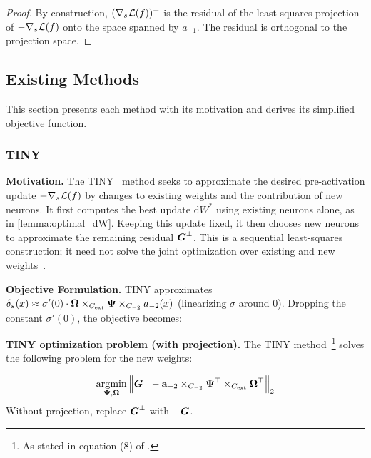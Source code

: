 \begin{proof}

By construction, \(\left( {\nabla_{s_{}}\mathcal{L}(f)} \right)^{\bot}\) is
the residual of the least-squares projection of
\(- {\nabla_{s_{}}\mathcal{L}(f)}\) onto the space spanned by \(a_{- 1}\). The
residual is orthogonal to the projection space.

\end{proof}

\subsection{Existing Methods}

This section presents each method with its motivation and derives its
simplified objective function.

\subsubsection{TINY}

\noindent\textbf{Motivation.} The TINY~\citep{verbockhaven_growing_2024} method seeks to approximate the desired pre-activation update \(-\nabla_{s_{}}\mathcal{L}(f)\) by changes to existing weights and the contribution of new neurons.
It first computes the best update \(\mathrm{d}W^*\) using existing neurons alone, as in \autoref{lemma:optimal_dW}.
Keeping this update fixed, it then chooses new neurons to approximate the remaining residual \(\boldsymbol{G}^\perp\).
This is a sequential least-squares construction; it need not solve the joint optimization over existing and new weights~\citep{verbockhaven_growing_2024}.

\noindent\textbf{Objective Formulation.} TINY approximates
\(\delta_{s_{}}(x) \approx \sigma'(0) \cdot \boldsymbol{\Omega}{} \times_{C_{\text{ext}}}\boldsymbol{\Psi}{} \times_{C_{- 2}}a_{- 2}(x)\)
(linearizing \(\sigma\) around \(0\)). Dropping the constant
\(\sigma'(0)\), the objective becomes:

\begin{proposition}

\textbf{TINY optimization problem (with projection).} The TINY method~\footnote{As stated in  equation (8) of \citep{verbockhaven_growing_2024}.} solves the following problem for the new weights:

\begin{equation}\label{eq:tiny_projection_optimization}
\operatorname*{\arg\!\min}_{\boldsymbol{\Psi}{},\boldsymbol{\Omega}{}}\left\| {{\boldsymbol{G}^\perp} - \mathbf{a}_{- 2} \times_{C_{- 2}}\boldsymbol{\Psi}{}^{\top} \times_{C_{\text{ext}}}\boldsymbol{\Omega}{}^{\top}} \right\|_{2}
\end{equation}
Without projection, replace \({\boldsymbol{G}^\perp}\) with \(- \boldsymbol{G}\).

\end{proposition}

